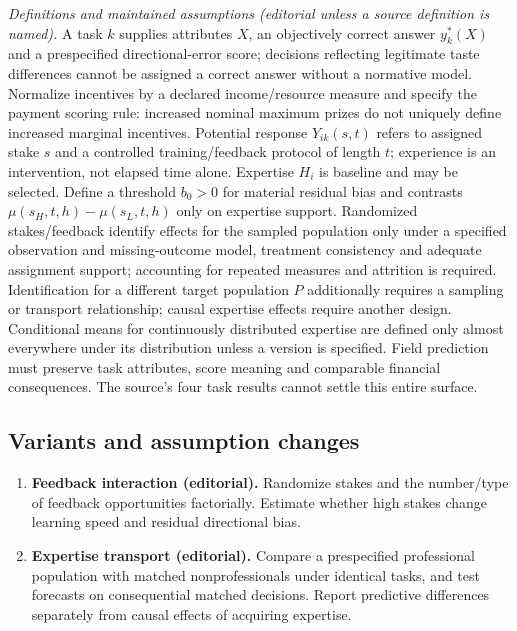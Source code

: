 \documentclass[11pt,a4paper]{article}
\begin{document}
\emph{Definitions and maintained assumptions (editorial unless a source definition is named).} A task \(k\) supplies attributes \(X\), an objectively correct answer \(y_k^*(X)\) and a prespecified directional-error score; decisions reflecting legitimate taste differences cannot be assigned a correct answer without a normative model. Normalize incentives by a declared income/resource measure and specify the payment scoring rule: increased nominal maximum prizes do not uniquely define increased marginal incentives. Potential response \(Y_{ik}(s,t)\) refers to assigned stake \(s\) and a controlled training/feedback protocol of length \(t\); experience is an intervention, not elapsed time alone. Expertise \(H_i\) is baseline and may be selected. Define a threshold \(b_0>0\) for material residual bias and contrasts \(\mu(s_H,t,h)-\mu(s_L,t,h)\) only on expertise support. Randomized stakes/feedback identify effects for the sampled population only under a specified observation and missing-outcome model, treatment consistency and adequate assignment support; accounting for repeated measures and attrition is required. Identification for a different target population \(P\) additionally requires a sampling or transport relationship; causal expertise effects require another design. Conditional means for continuously distributed expertise are defined only almost everywhere under its distribution unless a version is specified. Field prediction must preserve task attributes, score meaning and comparable financial consequences. The source’s four task results cannot settle this entire surface.
\subsection*{Variants and assumption changes}
\begin{enumerate}
\item \textbf{Feedback interaction (editorial).} Randomize stakes and the number/type of feedback opportunities factorially. Estimate whether high stakes change learning speed and residual directional bias.
\item \textbf{Expertise transport (editorial).} Compare a prespecified professional population with matched nonprofessionals under identical tasks, and test forecasts on consequential matched decisions. Report predictive differences separately from causal effects of acquiring expertise.
\end{enumerate}
\end{document}
